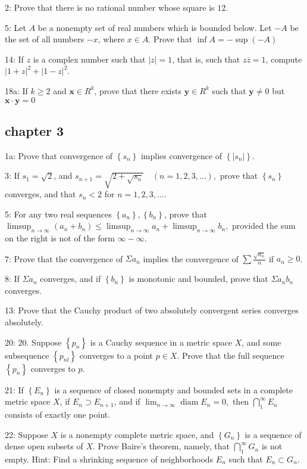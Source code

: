 \documentclass{article}
\begin{document}
2: Prove that there is no rational number whose square is $12$. 

5: Let $A$ be a nonempty set of real numbers which is bounded below. Let $-A$ be the set of all numbers $-x$, where $x \in A$. Prove that $\inf A=-\sup (-A)$

14: If $z$ is a complex number such that $|z|=1$, that is, such that $z \bar{z}=1$, compute $|1+z|^{2}+|1-z|^{2}$. 

18a: If $k \geq 2$ and $\mathbf{x} \in R^{k}$, prove that there exists $\mathbf{y} \in R^{k}$ such that $\mathbf{y} \neq 0$ but $\mathbf{x} \cdot \mathbf{y}=0$

\subsection*{chapter 3}
1a: Prove that convergence of $\left\{s_{n}\right\}$ implies convergence of $\left\{\left|s_{n}\right|\right\}$. 

3: If $s_{1}=\sqrt{2}$, and $s_{n+1}=\sqrt{2+\sqrt{s_{n}}} \quad(n=1,2,3, \ldots),$ prove that $\left\{s_{n}\right\}$ converges, and that $s_{n}<2$ for $n=1,2,3, \ldots$.

5: For any two real sequences $\left\{a_{n}\right\},\left\{b_{n}\right\}$, prove that $\limsup _{n \rightarrow \infty}\left(a_{n}+b_{n}\right) \leq \limsup _{n \rightarrow \infty} a_{n}+\limsup _{n \rightarrow \infty} b_{n},$ provided the sum on the right is not of the form $\infty-\infty$.

7: Prove that the convergence of $\Sigma a_{n}$ implies the convergence of $\sum \frac{\sqrt{a_{n}}}{n}$ if $a_n\geq 0$.

8: If $\Sigma a_{n}$ converges, and if $\left\{b_{n}\right\}$ is monotonic and bounded, prove that $\Sigma a_{n} b_{n}$ converges.

13: Prove that the Cauchy product of two absolutely convergent series converges absolutely.

20: 20. Suppose $\left\{p_{n}\right\}$ is a Cauchy sequence in a metric space $X$, and some subsequence $\left\{p_{n l}\right\}$ converges to a point $p \in X$. Prove that the full sequence $\left\{p_{n}\right\}$ converges to $p$.

21: If $\left\{E_{n}\right\}$ is a sequence of closed nonempty and bounded sets in a complete metric space $X$, if $E_{n} \supset E_{n+1}$, and if $\lim _{n \rightarrow \infty} \operatorname{diam} E_{n}=0,$ then $\bigcap_{1}^{\infty} E_{n}$ consists of exactly one point.

22: Suppose $X$ is a nonempty complete metric space, and $\left\{G_{n}\right\}$ is a sequence of dense open subsets of $X$. Prove Baire's theorem, namely, that $\bigcap_{1}^{\infty} G_{n}$ is not empty. Hint: Find a shrinking sequence of neighborhoods $E_{n}$ such that $E_{n} \subset G_{n}$. 
\end{document}

